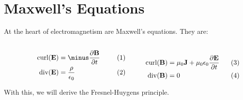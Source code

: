\section{Maxwell's Equations}
    At the heart of electromagnetism are Maxwell's equations.
    They are:
    \par
    \begin{subequations}
        \begin{minipage}[b]{0.49\textwidth}
            \centering
            \begin{align}
                \mathrm{curl}(\mathbf{E})
                    &=\minus\frac{\partial\mathbf{B}}{\partial{t}}\\
                \mathrm{div}(\mathbf{E})
                    &=\frac{\rho}{\epsilon_{0}}
            \end{align}
        \end{minipage}
        \hfill
        \begin{minipage}[b]{0.49\textwidth}
            \centering
            \begin{align}
                \mathrm{curl}(\mathbf{B})
                    &=\mu_{0}\mathbf{J}+\mu_{0}\epsilon_{0}
                      \frac{\partial\mathbf{E}}{\partial{t}}\\
                \mathrm{div}(\mathbf{B})&=0
            \end{align}
        \end{minipage}
    \end{subequations}
    \par
    With this, we will derive the Fresnel-Huygens principle.